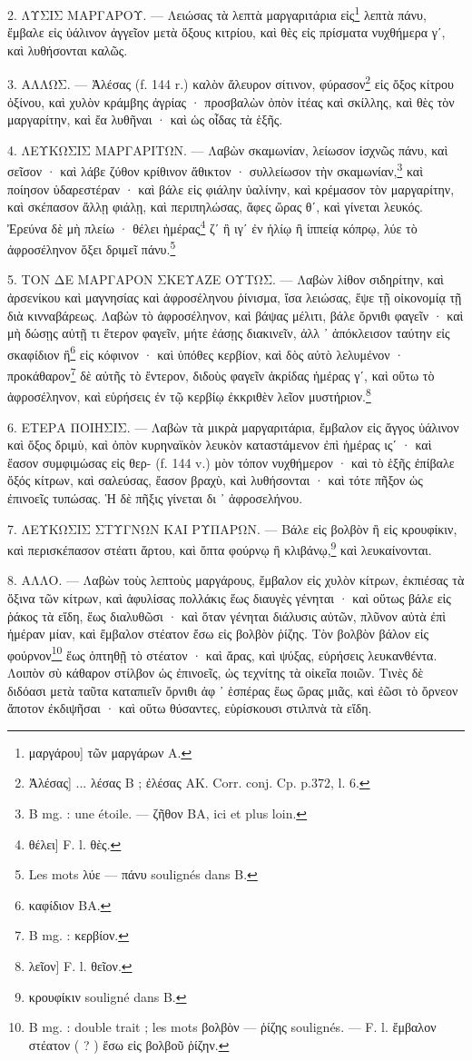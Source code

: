\documentclass[a4paper, 11pt, oneside, polutonikogreek, french]{article}
\begin{document}
2. ΛΥΣΙΣ ΜΑΡΓΑΡΟΥ. --- Λειώσας τὰ λεπτὰ μαργαριτάρια εἰς\footnote{μαργάρου] τῶν μαργάρων A.} λεπτὰ πάνυ, ἔμβαλε εἰς ὑάλινον ἀγγεῖον μετὰ ὄξους κιτρίου, καὶ θὲς εἰς πρίσματα νυχθήμερα γʹ, καὶ λυθήσονται καλῶς.

3. ΑΛΛΩΣ. --- Ἀλέσας (f. 144 r.) καλὸν ἄλευρον σίτινον, φύρασον\footnote{Ἀλέσας] ... λέσας B ; ἐλέσας AK. Corr. conj. Cp. p.372, l. 6.} εἰς ὄξος κίτρου ὀξίνου, καὶ χυλὸν κράμβης ἀγρίας · προσβαλὼν ὀπὸν ἰτέας καὶ σκίλλης, καὶ θὲς τὸν μαργαρίτην, καὶ ἔα λυθῆναι · καὶ ὡς οἶδας τὰ ἑξῆς.

4. ΛΕΥΚΩΣΙΣ ΜΑΡΓΑΡΙΤΩΝ. --- Λαβὼν σκαμωνίαν, λείωσον ἰσχνῶς πάνυ, καὶ σεῖσον · καὶ λάβε ζύθον κρίθινον ἄθικτον · συλλείωσον τὴν σκαμωνίαν,\footnote{B mg. : une étoile. --- ζῆθον BA, ici et plus loin.} καὶ ποίησον ὑδαρεστέραν · καὶ βάλε εἰς φιάλην ὑαλίνην, καὶ κρέμασον τὸν μαργαρίτην, καὶ σκέπασον ἄλλῃ φιάλῃ, καὶ περιπηλώσας, ἄφες ὥρας θʹ, καὶ γίνεται λευκός. Ἐρεύνα δὲ μὴ πλείω · θέλει ἡμέρας\footnote{θέλει] F. l. θὲς.} ζʹ ἢ ιγʹ ἐν ἡλίῳ ἢ ἱππείᾳ κόπρῳ, λύε τὸ ἀφροσέληνον ὄξει δριμεῖ πάνυ.\footnote{Les mots λύε --- πάνυ soulignés dans B.}

5. ΤΟΝ ΔΕ ΜΑΡΓΑΡΟΝ ΣΚΕΥΑΖΕ ΟΥΤΩΣ. --- Λαβὼν λίθον σιδηρίτην, καὶ ἀρσενίκου καὶ μαγνησίας καὶ ἀφροσέληνου ῥίνισμα, ἴσα λειώσας, ἕψε τῇ οἰκονομίᾳ τῇ διὰ κινναβάρεως. Λαβὼν τὸ ἀφροσέληνον, καὶ βάψας μέλιτι, βάλε ὄρνιθι φαγεῖν · καὶ μὴ δώσῃς αὐτῇ τι ἕτερον φαγεῖν, μήτε ἐάσῃς διακινεῖν, ἀλλ ᾽ ἀπόκλεισον ταύτην εἰς σκαφίδιον ἢ\footnote{καφίδιον BA.} εἰς κόφινον · καὶ ὑπόθες κερβίον, καὶ δὸς αὐτὸ λελυμένον · προκάθαρον\footnote{B mg. : κερβίον.} δὲ αὐτῆς τὸ ἔντερον, διδοὺς φαγεῖν ἀκρίδας ἡμέρας γʹ, καὶ οὕτω τὸ ἀφροσέληνον, καὶ εὑρήσεις ἐν τῷ κερβίῳ ἐκκριθὲν λεῖον μυστήριον.\footnote{λεῖον] F. l. θεῖον.}

6. ΕΤΕΡΑ ΠΟΙΗΣΙΣ. --- Λαβὼν τὰ μικρὰ μαργαριτάρια, ἔμβαλον εἰς ἄγγος ὑάλινον καὶ ὄξος δριμὺ, καὶ ὀπὸν κυρηναϊκὸν λευκὸν καταστάμενον ἐπὶ ἡμέρας ιςʹ · καὶ ἔασον συμφιμώσας εἰς θερ- (f. 144 v.) μὸν τόπον νυχθήμερον · καὶ τὸ ἑξῆς ἐπίβαλε ὄξός κίτρων, καὶ σαλεύσας, ἔασον βραχὺ, καὶ λυθήσονται · καὶ τότε πῆξον ὡς ἐπινοεῖς τυπώσας. Ἡ δὲ πῆξις γίνεται δι ᾽ ἀφροσελήνου.

7. ΛΕΥΚΩΣΙΣ ΣΤΥΓΝΩΝ ΚΑΙ ΡΥΠΑΡΩΝ. --- Βάλε εἰς βολβὸν ἢ εἰς κρουφίκιν, καὶ περισκέπασον στέατι ἄρτου, καὶ ὄπτα φούρνῳ ἢ κλιβάνῳ,\footnote{κρουφίκιν souligné dans B.} καὶ λευκαίνονται.

8. ΑΛΛΟ. --- Λαβὼν τοὺς λεπτοὺς μαργάρους, ἔμβαλον εἰς χυλὸν κίτρων, ἐκπιέσας τὰ ὄξινα τῶν κίτρων, καὶ ἀφυλίσας πολλάκις ἕως διαυγὲς γένηται · καὶ οὕτως βάλε εἰς ῥάκος τὰ εἴδη, ἕως διαλυθῶσι · καὶ ὅταν γένηται διάλυσις αὐτῶν, πλῦνον αὐτὰ ἐπὶ ἡμέραν μίαν, καὶ ἔμβαλον στέατον ἔσω εἰς βολβὸν ῥίζης. Τὸν βολβὸν βάλον εἰς φούρνον\footnote{B mg. : double trait ; les mots βολβὸν --- ῥίζης soulignés. --- F. l. ἔμβαλον στέατον ( ? ) ἔσω εἰς βολβοῦ ῥίζην.} ἕως ὀπτηθῇ τὸ στέατον · καὶ ἄρας, καὶ ψύξας, εὑρήσεις λευκανθέντα. Λοιπὸν σὺ κάθαρον στίλβον ὡς ἐπινοεῖς, ὡς τεχνίτης τὰ οἰκεῖα ποιῶν. Τινὲς δὲ διδόασι μετὰ ταῦτα καταπιεῖν ὄρνιθι ἀφ ᾽ ἑσπέρας ἕως ὥρας μιᾶς, καὶ ἐῶσι τὸ ὄρνεον ἄποτον ἐκδιψῆσαι · καὶ οὕτω θύσαντες, εὑρίσκουσι στιλπνὰ τὰ εἴδη.
\end{document}
